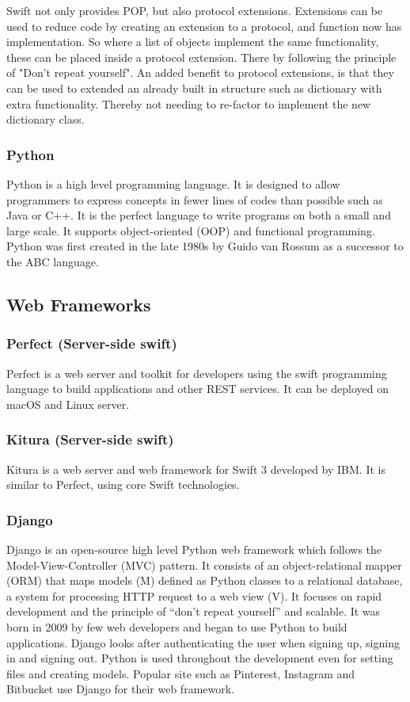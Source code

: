 Swift not only provides POP, but also protocol extensions. Extensions can be used to reduce code by creating an extension to a protocol, and function now has implementation. So where a list of objects implement the same functionality, these can be placed inside a protocol extension. There by following the principle of "Don't repeat yourself". \cite{repeat} An added benefit to protocol extensions, is that they can be used to extended an already built in structure such as dictionary with extra functionality. Thereby not needing to re-factor to implement the new dictionary class.

\subsubsection{Python}
Python \cite{python} is a high level programming language. It is designed to allow programmers to express concepts in fewer lines of codes than possible such as Java or C++. It is the perfect language to write programs on both a small and large scale. It supports object-oriented (OOP) and functional programming. Python was first created in the late 1980s by Guido van Rossum as a successor to the ABC language.

\subsection{Web Frameworks}

\subsubsection{Perfect (Server-side swift)}
Perfect \cite{perfect} is a web server and toolkit for developers using the swift programming language to build applications and other REST services. It can be deployed on macOS and Linux server.

\subsubsection{Kitura (Server-side swift)}
Kitura \cite{kitura} is a web server and web framework for Swift 3 developed by IBM. It is similar to Perfect, using core Swift technologies.

\subsubsection{Django}
Django \cite{django} is an open-source  high level Python web framework which follows the Model-View-Controller (MVC) pattern.  It consists of an object-relational mapper (ORM) that maps models (M)  defined as Python classes to a relational database, a system for processing  HTTP request to a web view (V).  It focuses on rapid development and the principle of  “don’t repeat yourself” and scalable. It was born in 2009 by few web developers and began to use Python to build applications. Django looks after authenticating the user when signing up, signing in and signing out. Python is used throughout the development even for setting files and creating models. Popular site such as Pinterest, Instagram and Bitbucket use Django for their web framework.

